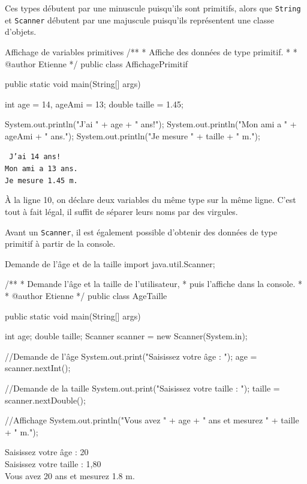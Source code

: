 \documentclass[12pt]{report}
\newenvironment{console}
	{
	\tcolorbox[title={Sortie console}, sharp corners = south, boxsep = 1.5mm]{} \tt
	}{\endtcolorbox}
\begin{document}
Ces types débutent par une minuscule puisqu'ils sont primitifs, alors que \texttt{String} et \texttt{Scanner} débutent par une majuscule puisqu'ils représentent une classe d'objets. 

\begin{MyTCB}{Affichage de variables primitives}
/**
 * Affiche des données de type primitif.
 * 
 * @author Etienne
 */
public class AffichagePrimitif {

	public static void main(String[] args) {
		
		int age = 14, ageAmi = 13;
		double taille = 1.45;
		
		System.out.println("J'ai " + age + " ans!");
		System.out.println("Mon ami a " + ageAmi + " ans.");
		System.out.println("Je mesure " + taille + " m.");

	}

}
\end{MyTCB}

\begin{tcolorbox}[title={Sortie console}, sharp corners = south, boxsep = 1.5mm] \tt
	J'ai 14 ans!\\
	Mon ami a 13 ans.\\
	Je mesure 1.45 m.
\end{tcolorbox}

À la ligne 10, on déclare deux variables du même type sur la même ligne. C'est tout à fait légal, il suffit de séparer leurs noms par des virgules.

Avant un \texttt{Scanner}, il est également possible d'obtenir des données de type primitif à partir de la console.

\begin{MyTCB}{Demande de l'âge et de la taille}
import java.util.Scanner;

/**
 * Demande l'âge et la taille de l'utilisateur,
 * puis l'affiche dans la console.
 * 
 * @author Etienne
 */
public class AgeTaille {

	public static void main(String[] args) {
		
		int age;
		double taille;
		Scanner scanner = new Scanner(System.in);
		
		//Demande de l'âge
		System.out.print("Saisissez votre âge : ");
		age = scanner.nextInt();
		
		//Demande de la taille
		System.out.print("Saisissez votre taille : ");
		taille = scanner.nextDouble();
		
		//Affichage
		System.out.println("Vous avez " + age + " ans et mesurez " + taille + " m.");

	}

}
\end{MyTCB}
\begin{console}
	Saisissez votre âge : {\color{blue} 20}\\
	Saisissez votre taille : {\color{blue} 1,80} \\
	Vous avez 20 ans et mesurez 1.8 m.
\end{console}
\end{document}
